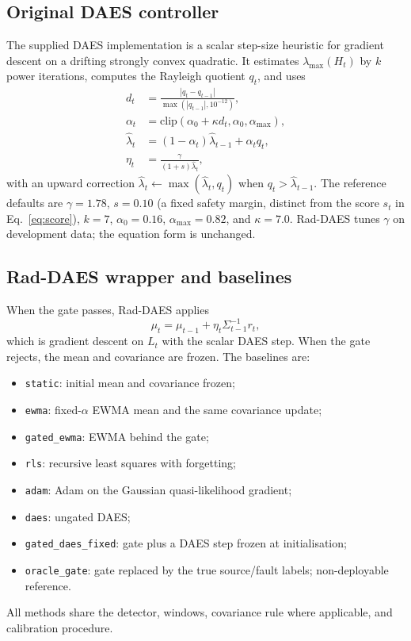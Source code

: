 \documentclass[11pt]{article}
\begin{document}
\subsection{Original DAES controller}

The supplied DAES implementation is a scalar step-size heuristic for gradient descent on a drifting strongly convex quadratic. It estimates $\lambda_{\max}(H_t)$ by $k$ power iterations, computes the Rayleigh quotient $q_t$, and uses
\begin{align}
  d_t &= \frac{|q_t-q_{t-1}|}{\max(|q_{t-1}|,10^{-12})},\\
  \alpha_t &= \mathrm{clip}(\alpha_0+\kappa d_t,\alpha_0,\alpha_{\max}),\\
  \hat\lambda_t &= (1-\alpha_t)\hat\lambda_{t-1}+\alpha_t q_t,\\
  \eta_t &= \frac{\gamma}{(1+s)\hat\lambda_t},
\end{align}
with an upward correction $\hat\lambda_t\leftarrow\max(\hat\lambda_t,q_t)$ when $q_t>\hat\lambda_{t-1}$. The reference defaults are $\gamma=1.78$, $s=0.10$ (a fixed safety margin, distinct from the score $s_t$ in Eq.~\eqref{eq:score}), $k=7$, $\alpha_0=0.16$, $\alpha_{\max}=0.82$, and $\kappa=7.0$. Rad-DAES tunes $\gamma$ on development data; the equation form is unchanged.

\subsection{Rad-DAES wrapper and baselines}

When the gate passes, Rad-DAES applies
\begin{equation}
  \mu_t = \mu_{t-1} + \eta_t \Sigma_{t-1}^{-1} r_t,
\end{equation}
which is gradient descent on $L_t$ with the scalar DAES step. When the gate rejects, the mean and covariance are frozen. The baselines are:
\begin{itemize}
  \item \texttt{static}: initial mean and covariance frozen;
  \item \texttt{ewma}: fixed-$\alpha$ EWMA mean and the same covariance update;
  \item \texttt{gated\_ewma}: EWMA behind the gate;
  \item \texttt{rls}: recursive least squares with forgetting;
  \item \texttt{adam}: Adam on the Gaussian quasi-likelihood gradient;
  \item \texttt{daes}: ungated DAES;
  \item \texttt{gated\_daes\_fixed}: gate plus a DAES step frozen at initialisation;
  \item \texttt{oracle\_gate}: gate replaced by the true source/fault labels; non-deployable reference.
\end{itemize}
All methods share the detector, windows, covariance rule where applicable, and calibration procedure.
\end{document}
